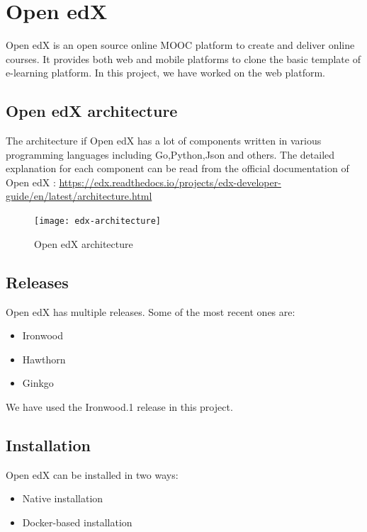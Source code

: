 \documentclass[12pt]{report}
\begin{document}
\section{Open edX}
Open edX is an open source online MOOC platform to create and deliver online courses. It provides both web and mobile platforms to clone the basic template of e-learning platform. In this project, we have worked on the web platform.
\subsection{Open edX architecture}
The architecture if Open edX has a lot of components written in various programming languages including Go,Python,Json and others. The  detailed explanation for each component can be read from the official documentation of Open edX : \url{https://edx.readthedocs.io/projects/edx-developer-guide/en/latest/architecture.html}\cite{OpenedXarch}
\begin{figure}[h!]
	\begin{center}
		\texttt{[image: edx-architecture]}
		\caption{Open edX architecture \cite{Edxarch}}
	\end{center}
\end{figure}
\subsection{Releases}
Open edX has multiple releases. Some of the most recent ones are:
\begin{itemize}
	\item Ironwood
	\item Hawthorn
	\item Ginkgo
\end{itemize}
We have used the Ironwood.1 release in this project.

\subsection{Installation}
Open edX can be installed in two ways:
\begin{itemize}
	\item Native installation
	\item Docker-based installation
\end{itemize}
\end{document}
